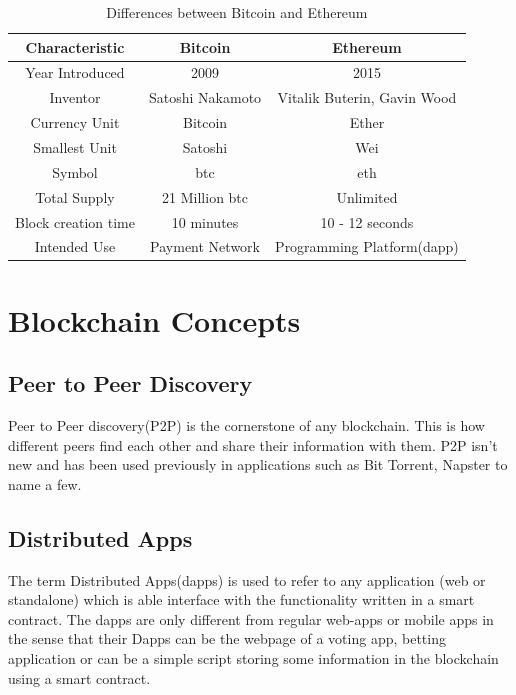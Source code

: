 \documentclass[11pt,openright]{report}
\begin{document}
\begin{table}[!htbp]
	\renewcommand{\arraystretch}{1.3}
	\caption{Differences between Bitcoin and Ethereum}
	\label{differences_bitcoin_ethereum}
	\centering
	\begin{tabular}{|c||c|c|}
		\hline
		\bfseries Characteristic & \bfseries Bitcoin & \bfseries Ethereum\\
		\hline\hline
	    Year Introduced & 2009 & 2015\\ \hline
	    Inventor & Satoshi Nakamoto & Vitalik Buterin, Gavin Wood\\ \hline
	    Currency Unit & Bitcoin & Ether\\ \hline
	    Smallest Unit & Satoshi & Wei\\ \hline
	    Symbol & btc & eth \\ \hline
	    Total Supply & 21 Million btc & Unlimited\\ \hline
	    Block creation time & 10 minutes & 10 - 12 seconds\\ \hline
	    Intended Use & Payment Network & Programming Platform(dapp)\\ \hline

	\end{tabular}
\end{table}

\section{Blockchain Concepts}
\subsection{Peer to Peer Discovery}
Peer to Peer discovery(P2P) is the cornerstone of any blockchain. This is how different peers find each other and share their information with them. P2P isn't new and has been used previously in applications such as Bit Torrent, Napster to name a few.

\subsection{Distributed Apps}
The term Distributed Apps(dapps) is used to refer to any application (web or standalone) which is able interface with the functionality written in a smart contract. The dapps are only different from regular web-apps or mobile apps in the sense that their Dapps can be the webpage of a voting app, betting application or can be a simple script storing some information in the blockchain using a smart contract.
\end{document}
